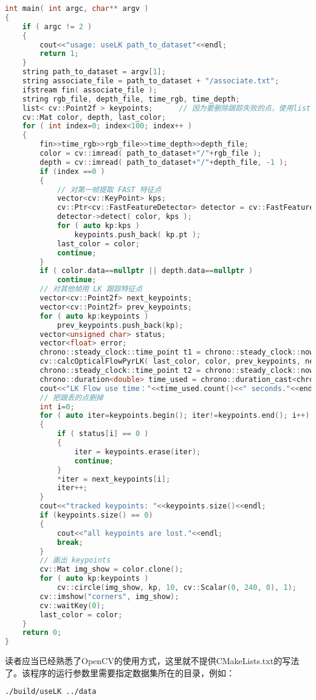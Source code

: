 \begin{lstlisting}[language=c++,caption=slambook/ch8/useLK/useLK.cpp]
int main( int argc, char** argv )
{
	if ( argc != 2 )
	{
		cout<<"usage: useLK path_to_dataset"<<endl;
		return 1;
	}
	string path_to_dataset = argv[1];
	string associate_file = path_to_dataset + "/associate.txt";
	ifstream fin( associate_file );
	string rgb_file, depth_file, time_rgb, time_depth;
	list< cv::Point2f > keypoints;      // 因为要删除跟踪失败的点，使用list
	cv::Mat color, depth, last_color;
	for ( int index=0; index<100; index++ )
	{
		fin>>time_rgb>>rgb_file>>time_depth>>depth_file;
		color = cv::imread( path_to_dataset+"/"+rgb_file );
		depth = cv::imread( path_to_dataset+"/"+depth_file, -1 );
		if (index ==0 )
		{
			// 对第一帧提取 FAST 特征点
			vector<cv::KeyPoint> kps;
			cv::Ptr<cv::FastFeatureDetector> detector = cv::FastFeatureDetector::create();
			detector->detect( color, kps );
			for ( auto kp:kps )
				keypoints.push_back( kp.pt );
			last_color = color;
			continue;
		}
        if ( color.data==nullptr || depth.data==nullptr )
	        continue;
		// 对其他帧用 LK 跟踪特征点
		vector<cv::Point2f> next_keypoints; 
		vector<cv::Point2f> prev_keypoints;
		for ( auto kp:keypoints )
			prev_keypoints.push_back(kp);
		vector<unsigned char> status;
		vector<float> error; 
		chrono::steady_clock::time_point t1 = chrono::steady_clock::now();
		cv::calcOpticalFlowPyrLK( last_color, color, prev_keypoints, next_keypoints, status, error );
		chrono::steady_clock::time_point t2 = chrono::steady_clock::now();
		chrono::duration<double> time_used = chrono::duration_cast<chrono::duration<double>>( t2-t1 );
		cout<<"LK Flow use time："<<time_used.count()<<" seconds."<<endl;
		// 把跟丢的点删掉
		int i=0; 
		for ( auto iter=keypoints.begin(); iter!=keypoints.end(); i++)
		{
			if ( status[i] == 0 )
			{
				iter = keypoints.erase(iter);
				continue;
			}
			*iter = next_keypoints[i];
			iter++;
		}
		cout<<"tracked keypoints: "<<keypoints.size()<<endl;
		if (keypoints.size() == 0)
		{
			cout<<"all keypoints are lost."<<endl;
			break; 
		}
		// 画出 keypoints
		cv::Mat img_show = color.clone();
		for ( auto kp:keypoints )
			cv::circle(img_show, kp, 10, cv::Scalar(0, 240, 0), 1);
		cv::imshow("corners", img_show);
		cv::waitKey(0);
		last_color = color;
	}
	return 0;
}
\end{lstlisting}

读者应当已经熟悉了OpenCV的使用方式，这里就不提供CMakeLists.txt的写法了。该程序的运行参数里需要指定数据集所在的目录，例如：
\begin{lstlisting}[language=sh]
./build/useLK ../data
\end{lstlisting}

